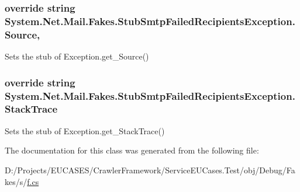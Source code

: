 \hypertarget{class_system_1_1_net_1_1_mail_1_1_fakes_1_1_stub_smtp_failed_recipients_exception_a18feb7b57d1e50856f72688821fe5c9e}{
\subsubsection[{Source}]{\setlength{\rightskip}{0pt plus 5cm}override string System.\-Net.\-Mail.\-Fakes.\-Stub\-Smtp\-Failed\-Recipients\-Exception.\-Source\hspace{0.3cm}{\ttfamily [get]}, {\ttfamily [set]}}}\label{class_system_1_1_net_1_1_mail_1_1_fakes_1_1_stub_smtp_failed_recipients_exception_a18feb7b57d1e50856f72688821fe5c9e}


Sets the stub of Exception.\-get\-\_\-\-Source()

\hypertarget{class_system_1_1_net_1_1_mail_1_1_fakes_1_1_stub_smtp_failed_recipients_exception_a9e163cf300448b665634ebe87e30d0f2}{
\subsubsection[{Stack\-Trace}]{\setlength{\rightskip}{0pt plus 5cm}override string System.\-Net.\-Mail.\-Fakes.\-Stub\-Smtp\-Failed\-Recipients\-Exception.\-Stack\-Trace\hspace{0.3cm}{\ttfamily [get]}}}\label{class_system_1_1_net_1_1_mail_1_1_fakes_1_1_stub_smtp_failed_recipients_exception_a9e163cf300448b665634ebe87e30d0f2}


Sets the stub of Exception.\-get\-\_\-\-Stack\-Trace()



The documentation for this class was generated from the following file\-:\begin{DoxyCompactItemize}
\item 
D\-:/\-Projects/\-E\-U\-C\-A\-S\-E\-S/\-Crawler\-Framework/\-Service\-E\-U\-Cases.\-Test/obj/\-Debug/\-Fakes/s/\hyperlink{s_2f_8cs}{f.\-cs}\end{DoxyCompactItemize}

